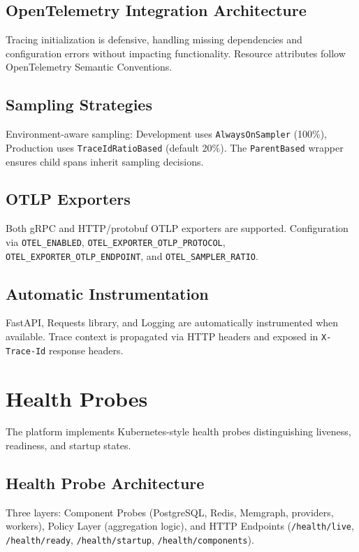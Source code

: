 \documentclass[a4paper,twoside]{sapthesis}
\begin{document}
\subsection{OpenTelemetry Integration Architecture}

Tracing initialization is defensive, handling missing dependencies and configuration errors without impacting functionality. Resource attributes follow OpenTelemetry Semantic Conventions.

\subsection{Sampling Strategies}

Environment-aware sampling: Development uses \texttt{AlwaysOnSampler} (100\%), Production uses \texttt{TraceIdRatioBased} (default 20\%). The \texttt{ParentBased} wrapper ensures child spans inherit sampling decisions.

\subsection{OTLP Exporters}

Both gRPC and HTTP/protobuf OTLP exporters are supported. Configuration via \texttt{OTEL\_ENABLED}, \texttt{OTEL\_EXPORTER\_OTLP\_PROTOCOL}, \texttt{OTEL\_EXPORTER\_OTLP\_ENDPOINT}, and \texttt{OTEL\_SAMPLER\_RATIO}.

\subsection{Automatic Instrumentation}

FastAPI, Requests library, and Logging are automatically instrumented when available. Trace context is propagated via HTTP headers and exposed in \texttt{X-Trace-Id} response headers.

\section{Health Probes}
\label{sec:health-probes}

The platform implements Kubernetes-style health probes distinguishing liveness, readiness, and startup states.

\subsection{Health Probe Architecture}

Three layers: Component Probes (PostgreSQL, Redis, Memgraph, providers, workers), Policy Layer (aggregation logic), and HTTP Endpoints (\texttt{/health/live}, \texttt{/health/ready}, \texttt{/health/startup}, \texttt{/health/components}).
\end{document}
